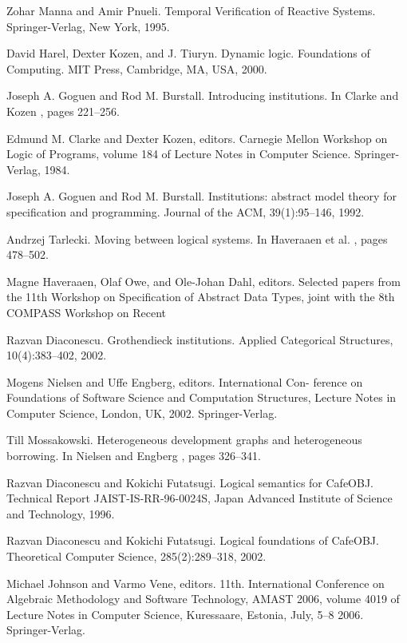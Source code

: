 \begin{thebibliography}{tesis}
 Zohar Manna and Amir Pnueli. Temporal Verification of Reactive Systems. Springer-Verlag, New York, 1995. 

 David Harel, Dexter Kozen, and J. Tiuryn. Dynamic logic. Foundations of Computing. MIT Press, Cambridge, MA, USA, 2000.  

 Joseph A. Goguen and Rod M. Burstall. Introducing institutions. In Clarke and Kozen \cite{CK84}, pages 221–256.  

 Edmund M. Clarke and Dexter Kozen, editors. Carnegie Mellon Workshop on Logic of Programs, volume 184 of Lecture Notes in Computer Science. Springer-Verlag, 1984. 

 Joseph A. Goguen and Rod M. Burstall. Institutions: abstract model theory for specification and programming. Journal of the ACM, 39(1):95–146, 1992. 

 Andrzej Tarlecki. Moving between logical systems. In Haveraaen et al. \cite{HOD96}, pages 478–502.

 Magne Haveraaen, Olaf Owe, and Ole-Johan Dahl, editors. Selected papers from the 11th Workshop on Specification of Abstract Data Types, joint with the 8th COMPASS Workshop on Recent

 Razvan Diaconescu. Grothendieck institutions. Applied Categorical Structures, 10(4):383–402, 2002.

 Mogens Nielsen and Uffe Engberg, editors. International Con- ference on Foundations of Software Science and Computation Structures, Lecture Notes in Computer Science, London, UK, 2002. Springer-Verlag.

 Till Mossakowski. Heterogeneous development graphs and heterogeneous borrowing. In Nielsen and Engberg \cite{NE02}, pages 326–341. 

 Razvan Diaconescu and Kokichi Futatsugi. Logical semantics for CafeOBJ. Technical Report JAIST-IS-RR-96-0024S, Japan Advanced Institute of Science and Technology, 1996. 

 Razvan Diaconescu and Kokichi Futatsugi. Logical foundations of CafeOBJ. Theoretical Computer Science, 285(2):289–318, 2002. 

  Michael Johnson and Varmo Vene, editors. 11th. International Conference on Algebraic Methodology and Software Technology, AMAST 2006, volume 4019 of Lecture Notes in Computer Science, Kuressaare, Estonia, July, 5–8 2006. Springer-Verlag. 


\end{thebibliography}
